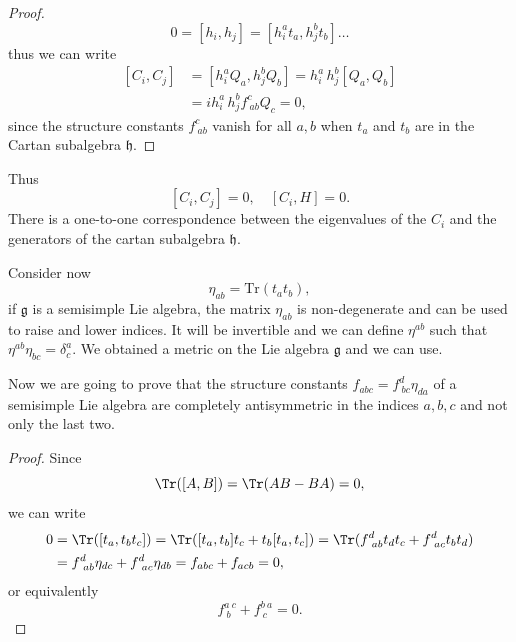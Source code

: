\begin{proof}
    \[
        0 = [h_i, h_j] = [h_i^a t_a, h_j^b t_b]\dots
    \]
    thus we can write
    \[
        \begin{aligned}
            [C_i, C_j] & = [h_i^a Q_a, h_j^b Q_b] = h_i^a \, h_j^b [Q_a, Q_b] \\
                       & = i h_i^a \, h_j^b f^c_{\ ab} Q_c = 0,
        \end{aligned}
    \]
    since the structure constants \(f^c_{\ ab}\) vanish for all \(a, b\) when \(t_a\) and \(t_b\) are in the Cartan subalgebra \(\mathfrak{h}\).
\end{proof}

Thus
\[
    [C_i, C_j] = 0, \quad [C_i, H] = 0.
\]
There is a one-to-one correspondence between the eigenvalues of the \(C_i\) and the generators of the cartan subalgebra \(\mathfrak{h}\).

Consider now
\[
    \eta_{ab} = \text{Tr}(t_a t_b),
\]
if \(\mathfrak{g}\) is a semisimple Lie algebra, the matrix \(\eta_{ab}\) is non-degenerate and can be used to raise and lower indices. It will be invertible and we can define \(\eta^{ab}\) such that \(\eta^{ab} \eta_{bc} = \delta^a_c\). We obtained a metric on the Lie algebra \(\mathfrak{g}\) and we can use.

Now we are going to prove that the structure constants \(f_{abc} = f^d_{\ bc} \eta_{da}\) of a semisimple Lie algebra are completely antisymmetric in the indices \(a, b, c\) and not only the last two.
\begin{proof}
    Since
    \[
        \Tr([A, B]) = \Tr(AB - BA) = 0,
    \]
    we can write
    \[
        \begin{aligned}
            0 & = \Tr([t_a, t_b t_c]) = \Tr([t_a, t_b] t_c + t_b [t_a, t_c]) = \Tr(f^d_{\ ab} t_d t_c + f^d_{\ ac} t_b t_d) \\
              & = f^d_{\ ab} \eta_{dc} + f^d_{\ ac} \eta_{db} = f_{abc} + f_{acb} = 0,
        \end{aligned}
    \]
    or equivalently
    \[
        f^{a \ c}_{\ b} + f^{b \ a}_{\ c} = 0.
    \]
\end{proof}

